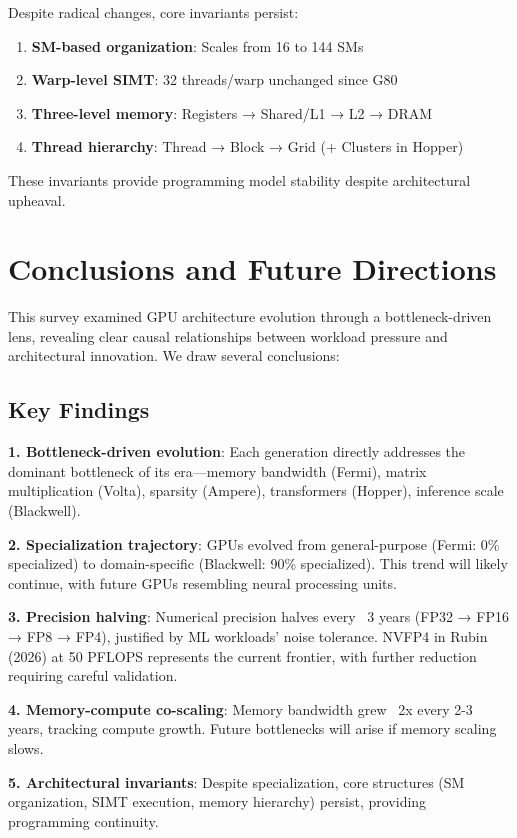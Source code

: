 \documentclass{article}
\begin{document}
Despite radical changes, core invariants persist:
\begin{enumerate}
\item \textbf{SM-based organization}: Scales from 16 to 144 SMs
\item \textbf{Warp-level SIMT}: 32 threads/warp unchanged since G80
\item \textbf{Three-level memory}: Registers → Shared/L1 → L2 → DRAM
\item \textbf{Thread hierarchy}: Thread → Block → Grid (+ Clusters in Hopper)
\end{enumerate}

These invariants provide programming model stability despite architectural upheaval.

\section{Conclusions and Future Directions}

This survey examined GPU architecture evolution through a bottleneck-driven lens, revealing clear causal relationships between workload pressure and architectural innovation. We draw several conclusions:

\subsection{Key Findings}

\textbf{1. Bottleneck-driven evolution}: Each generation directly addresses the dominant bottleneck of its era—memory bandwidth (Fermi), matrix multiplication (Volta), sparsity (Ampere), transformers (Hopper), inference scale (Blackwell).

\textbf{2. Specialization trajectory}: GPUs evolved from general-purpose (Fermi: 0\% specialized) to domain-specific (Blackwell: 90\% specialized). This trend will likely continue, with future GPUs resembling neural processing units.

\textbf{3. Precision halving}: Numerical precision halves every ~3 years (FP32 → FP16 → FP8 → FP4), justified by ML workloads' noise tolerance. NVFP4 in Rubin (2026) at 50 PFLOPS represents the current frontier, with further reduction requiring careful validation.

\textbf{4. Memory-compute co-scaling}: Memory bandwidth grew ~2x every 2-3 years, tracking compute growth. Future bottlenecks will arise if memory scaling slows.

\textbf{5. Architectural invariants}: Despite specialization, core structures (SM organization, SIMT execution, memory hierarchy) persist, providing programming continuity.
\end{document}
